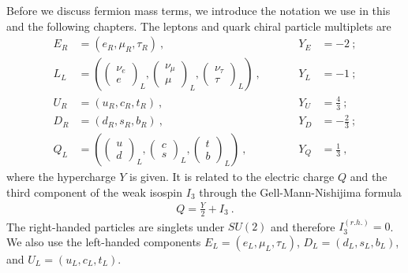 Before we discuss fermion mass terms, we introduce the notation we use in this and the following chapters. The leptons and quark chiral particle multiplets are
\begin{align}
	E_R &= (e_R,\mu_R,\tau_R) \ , &&\quad &Y_E &= -2 \ ; \\
	L_L &= \left(\begin{pmatrix} \nu_e \\ e \end{pmatrix}_L,
	\begin{pmatrix} \nu_\mu \\ \mu \end{pmatrix}_L,
	\begin{pmatrix} \nu_\tau \\ \tau \end{pmatrix}_L\right) \ , &&\quad &Y_L &= -1 \ ; \\
	U_R &= (u_R,c_R,t_R) \ , &&\quad &Y_U &= \frac{4}{3} \ ; \\
	D_R &= (d_R,s_R,b_R) \ , &&\quad &Y_D &= -\frac{2}{3} \ ; \\
	Q_L &= \left(\begin{pmatrix} u \\ d \end{pmatrix}_L,
	\begin{pmatrix} c \\ s \end{pmatrix}_L,
	\begin{pmatrix} t \\ b \end{pmatrix}_L\right) \ , &&\quad &Y_Q &= \frac{1}{3} \ ,
\end{align}
where the hypercharge $Y$ is given. It is related to the electric charge $Q$ and the third component of the weak isospin $I_3$ through the Gell-Mann-Nishijima formula \cite[Chapter 10.7]{Griffiths}
\begin{align}\label{eq:GellMann}
	Q = \frac{Y}{2} + I_3 \ .
\end{align}
The right-handed particles are singlets under $SU(2)$ and therefore $I^{(r.h.)}_3=0$. We also use the left-handed components $E_L = (e_L,\mu_L,\tau_L)$, $D_L = (d_L,s_L,b_L)$, and $U_L = (u_L,c_L,t_L)$.



